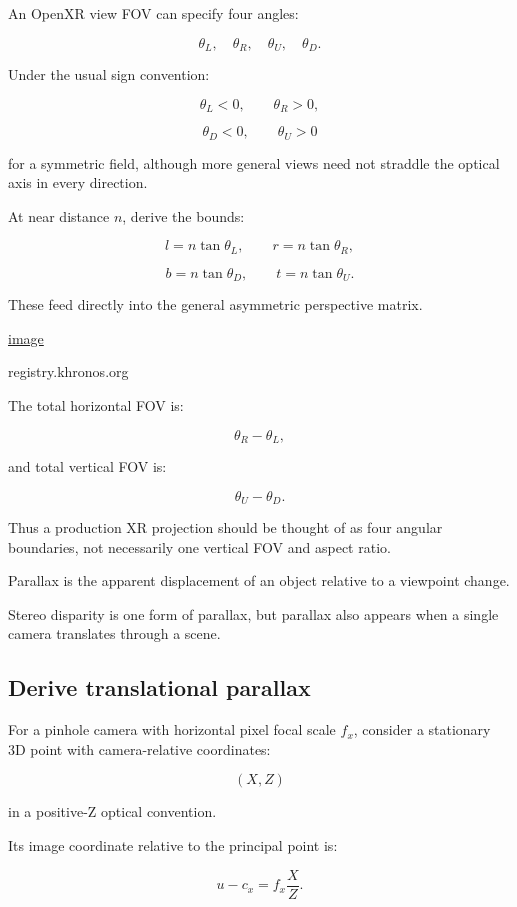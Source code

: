 An OpenXR view FOV can specify four angles:

\[ \theta_L,\quad\theta_R,\quad\theta_U,\quad\theta_D. \]

Under the usual sign convention:

\[ \theta_L<0,\qquad\theta_R>0, \]

\[ \theta_D<0,\qquad\theta_U>0 \]

for a symmetric field, although more general views need not straddle the optical axis in every direction.

At near distance \(n\), derive the bounds:

\[ \boxed{ l=n\tan\theta_L,\qquad r=n\tan\theta_R, } \]

\[ \boxed{ b=n\tan\theta_D,\qquad t=n\tan\theta_U. } \]

These feed directly into the general asymmetric perspective matrix. 

\href{https://www.google.com/s2/favicons?domain=https://registry.khronos.org&sz=32}{image}

registry.khronos.org

The total horizontal FOV is:

\[ \theta_R-\theta_L, \]

and total vertical FOV is:

\[ \theta_U-\theta_D. \]

Thus a production XR projection should be thought of as four angular boundaries, not necessarily one vertical FOV and aspect ratio.

Parallax is the apparent displacement of an object relative to a viewpoint change.

Stereo disparity is one form of parallax, but parallax also appears when a single camera translates through a scene.

\subsection{Derive translational parallax}\label{02-foundations-ii-ch035-derive-translational-parallax}

For a pinhole camera with horizontal pixel focal scale \(f_x\), consider a stationary 3D point with camera-relative coordinates:

\[ (X,Z) \]

in a positive-Z optical convention.

Its image coordinate relative to the principal point is:

\[ u-c_x=f_x\frac XZ. \]

